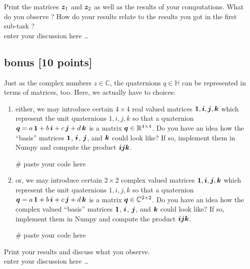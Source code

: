 Print the matrices $\bm{z}_1$ and $\bm{z}_2$ as well as the results of your computations. What do you observe ? How do your results relate to the results you got in the first sub-task ?
\color{blue} \\[1ex]
enter your discussion here \ldots
\color{black}
\newpage





\subsection*{bonus [10 points]}
Just as the complex numbers $z \in \mathbb{C}$, the quaternions $q \in \mathbb{H}$ can be represented in terms of matrices, too. Here, we actually have to choices: 

\begin{enumerate}
\item either, we may introduce certain $4 \times 4$ real valued matrices $\bm{1}, \bm{i}, \bm{j}, \bm{k}$ which represent the unit quaternions $1, i, j, k$ so that a quaternion $\bm{q} = a \, \bm{1} + b \, \bm{i} + c \, \bm{j} + d \, \bm{k}$ is a matrix $\bm{q} \in \mathbb{R}^{4 \times 4}$. Do you have an idea how the ``basis'' matrices $\bm{1}$, $\bm{i}$, $\bm{j}$, and $\bm{k}$ could look like? If so, implement them in Numpy and compute the product $\bm{i} \bm{j} \bm{k}$.
\begin{python}
# paste your code here

\end{python}
\item or, we may introduce certain $2 \times 2$ complex valued matrices $\bm{1}, \bm{i}, \bm{j}, \bm{k}$ which represent the unit quaternions $1, i, j, k$ so that a quaternion $\bm{q} = a \, \bm{1} + b \, \bm{i} + c \, \bm{j} + d \, \bm{k}$ is a matrix $\bm{q} \in \mathbb{C}^{2 \times 2}$. Do you have an idea how the complex valued ``basis'' matrices $\bm{1}$, $\bm{i}$, $\bm{j}$, and $\bm{k}$ could look like? If so, implement them in Numpy and compute the product $\bm{i} \bm{j} \bm{k}$.
\begin{python}
# paste your code here

\end{python}
\end{enumerate}
Print your results and discuss what you observe.
\color{blue} \\[1ex]
enter your discussion here \ldots
\color{black}

